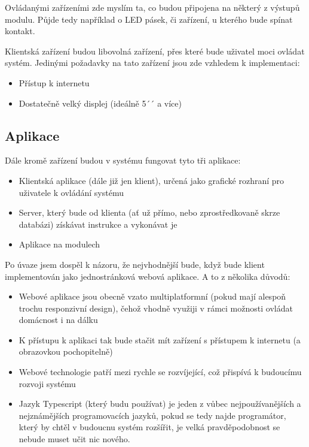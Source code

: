 Ovládanými zařízeními zde myslím ta, co budou připojena na některý z výstupů modulu. Půjde tedy například o LED pásek, či zařízení, u kterého bude spínat kontakt.

Klientská zařízení budou libovolná zařízení, přes které bude uživatel moci ovládat systém. Jedinými požadavky na tato zařízení jsou zde vzhledem k implementaci:
\begin{itemize}
    \item Přístup k internetu
    \item Dostatečně velký displej (ideálně 5´´ a více)
\end{itemize}

\subsection*{Aplikace}
Dále kromě zařízení budou v systému fungovat tyto tři aplikace:
\begin{itemize}
    \item Klientská aplikace (dále již jen klient), určená jako grafické rozhraní pro uživatele k ovládání systému
    \item Server, který bude od klienta (ať už přímo, nebo zprostředkovaně skrze databázi) získávat instrukce a vykonávat je
    \item Aplikace na modulech
\end{itemize}

Po úvaze jsem dospěl k názoru, že nejvhodnější bude, když bude klient implementován jako jednostránková webová aplikace. A to z několika důvodů:
\begin{itemize}
    \item Webové aplikace jsou obecně vzato multiplatformní (pokud mají alespoň trochu responzivní design), čehož vhodně využiji v rámci možnosti ovládat domácnost i na dálku
    \item K přístupu k aplikaci tak bude stačit mít zařízení s přístupem k internetu (a obrazovkou pochopitelně)
    \item Webové technologie patří mezi rychle se rozvíjející, což přispívá k budoucímu rozvoji systému
    \item Jazyk Typescript (který budu používat) je jeden z vůbec nejpoužívanějších a nejznámějších programovacích jazyků, pokud se tedy najde programátor, který by chtěl v budoucnu systém rozšířit, je velká pravděpodobnost se nebude muset učit nic nového.
\end{itemize}

